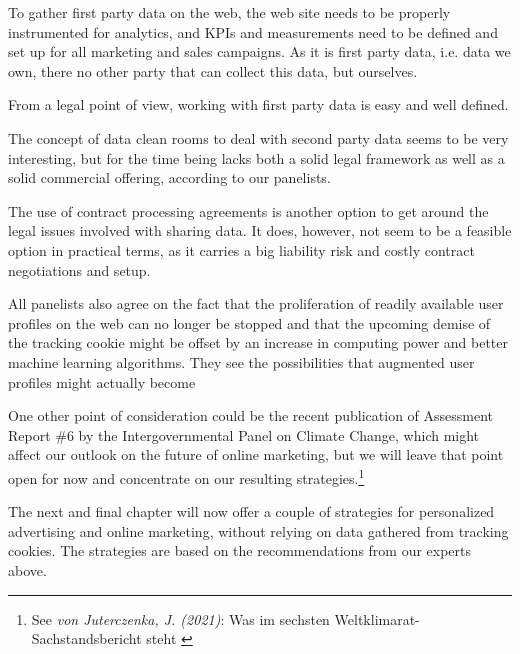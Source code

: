 To gather first party data on the web, the web site needs to be properly instrumented for analytics, and KPIs and measurements need to be defined and set up for all marketing and sales campaigns. As it is first party data, i.e. data we own, there no other party that can collect this data, but ourselves.

From a legal point of view, working with first party data is easy and well defined.

The concept of data clean rooms to deal with second party data seems to be very interesting, but for the time being lacks both a solid legal framework as well as a solid commercial offering, according to our panelists.

The use of contract processing agreements is another option to get around the legal issues involved with sharing data. It does, however, not seem to be a feasible option in practical terms, as it carries a big liability risk and costly contract negotiations and setup.

All panelists also agree on the fact that the proliferation of readily available user profiles on the web can no longer be stopped and that the upcoming demise of the tracking cookie might be offset by an increase in computing power and better machine learning algorithms. They see the possibilities that augmented user profiles might actually become 

One other point of consideration could be the recent publication of Assessment Report \#6 by the Intergovernmental Panel on Climate Change, which might affect our outlook on the future of online marketing, but we will leave that point open for now and concentrate on our resulting strategies.\footnote{See \textit{von Juterczenka, J. (2021)}: Was im sechsten Weltklimarat-Sachstandsbericht steht \cite{ipccAr6}}

The next and final chapter will now offer a couple of strategies for personalized advertising and online marketing, without relying on data gathered from tracking cookies. The strategies are based on the recommendations from our experts above.
